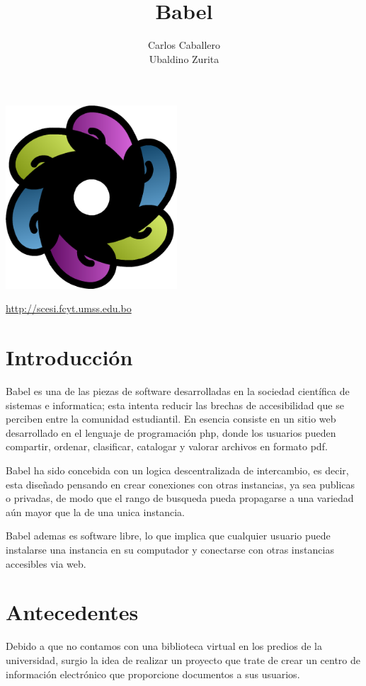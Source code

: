 \documentclass[letter,12pt]{article}
\title{\bf Babel}
\author{Carlos Caballero\\Ubaldino Zurita}
\begin{document}
\maketitle
\begin{center}\includegraphics[width=0.48\textwidth]{../img/babel.png}\end{center}
\begin{center}\url {http://scesi.fcyt.umss.edu.bo}\end{center}
\pagebreak

\tableofcontents
\pagebreak

\section{Introducción}
Babel es una de las piezas de software desarrolladas en la sociedad científica de sistemas e
informatica; esta intenta reducir las brechas de accesibilidad que se perciben entre la comunidad
estudiantil. En esencia consiste en un sitio web desarrollado en el lenguaje de programación php,
donde los usuarios pueden compartir, ordenar, clasificar, catalogar y valorar archivos en formato
pdf.

Babel ha sido concebida con un logica descentralizada de intercambio, es decir, esta diseñado
pensando en crear conexiones con otras instancias, ya sea publicas o privadas, de modo que el rango
de busqueda pueda propagarse a una variedad aún mayor que la de una unica instancia.

Babel ademas es software libre, lo que implica que cualquier usuario puede instalarse una instancia
en su computador y conectarse con otras instancias accesibles via web.

\section{Antecedentes}
Debido a que no contamos con una biblioteca virtual en los predios de la universidad, surgio la
idea de realizar un proyecto que trate de crear un centro de información electrónico que 
proporcione documentos a sus usuarios.
\end{document}
